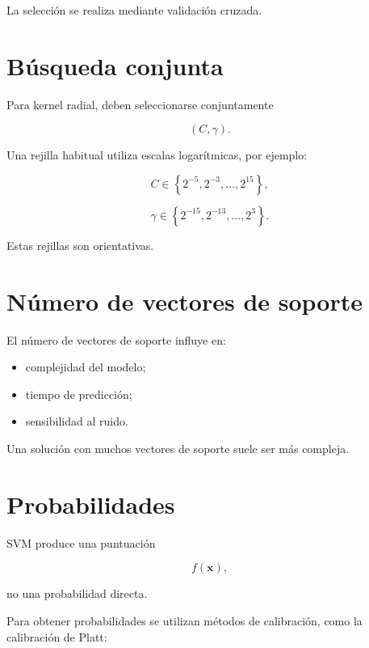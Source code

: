 \documentclass[
  spanish,
  10.5pt,
  letterpaper,
  DIV=11,
  numbers=noendperiod,
  oneside,
  open=any]{scrreprt}
\providecommand{\tightlist}{%
  \setlength{\itemsep}{0pt}\setlength{\parskip}{0pt}}
\theoremstyle{definition}
\theoremstyle{definition}
\theoremstyle{plain}
\theoremstyle{remark}
\begin{document}
La selección se realiza mediante validación cruzada.

\section*{Búsqueda conjunta}\label{buxfasqueda-conjunta}


Para kernel radial, deben seleccionarse conjuntamente

\[
(C,\gamma).
\]

Una rejilla habitual utiliza escalas logarítmicas, por ejemplo:

\[
C\in
\left\{
2^{-5},2^{-3},\ldots,2^{15}
\right\},
\]

\[
\gamma\in
\left\{
2^{-15},2^{-13},\ldots,2^{3}
\right\}.
\]

Estas rejillas son orientativas.

\section*{Número de vectores de
soporte}\label{nuxfamero-de-vectores-de-soporte}


El número de vectores de soporte influye en:

\begin{itemize}
\tightlist
\item
  complejidad del modelo;
\item
  tiempo de predicción;
\item
  sensibilidad al ruido.
\end{itemize}

Una solución con muchos vectores de soporte suele ser más compleja.

\section*{Probabilidades}\label{probabilidades}


SVM produce una puntuación

\[
f(\mathbf{x}),
\]

no una probabilidad directa.

Para obtener probabilidades se utilizan métodos de calibración, como la
calibración de Platt:
\end{document}
